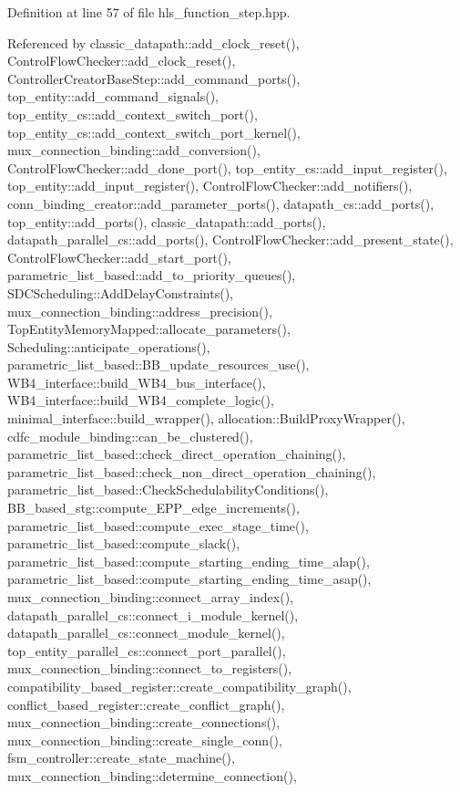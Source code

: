 Definition at line 57 of file hls\+\_\+function\+\_\+step.\+hpp.



Referenced by classic\+\_\+datapath\+::add\+\_\+clock\+\_\+reset(), Control\+Flow\+Checker\+::add\+\_\+clock\+\_\+reset(), Controller\+Creator\+Base\+Step\+::add\+\_\+command\+\_\+ports(), top\+\_\+entity\+::add\+\_\+command\+\_\+signals(), top\+\_\+entity\+\_\+cs\+::add\+\_\+context\+\_\+switch\+\_\+port(), top\+\_\+entity\+\_\+cs\+::add\+\_\+context\+\_\+switch\+\_\+port\+\_\+kernel(), mux\+\_\+connection\+\_\+binding\+::add\+\_\+conversion(), Control\+Flow\+Checker\+::add\+\_\+done\+\_\+port(), top\+\_\+entity\+\_\+cs\+::add\+\_\+input\+\_\+register(), top\+\_\+entity\+::add\+\_\+input\+\_\+register(), Control\+Flow\+Checker\+::add\+\_\+notifiers(), conn\+\_\+binding\+\_\+creator\+::add\+\_\+parameter\+\_\+ports(), datapath\+\_\+cs\+::add\+\_\+ports(), top\+\_\+entity\+::add\+\_\+ports(), classic\+\_\+datapath\+::add\+\_\+ports(), datapath\+\_\+parallel\+\_\+cs\+::add\+\_\+ports(), Control\+Flow\+Checker\+::add\+\_\+present\+\_\+state(), Control\+Flow\+Checker\+::add\+\_\+start\+\_\+port(), parametric\+\_\+list\+\_\+based\+::add\+\_\+to\+\_\+priority\+\_\+queues(), S\+D\+C\+Scheduling\+::\+Add\+Delay\+Constraints(), mux\+\_\+connection\+\_\+binding\+::address\+\_\+precision(), Top\+Entity\+Memory\+Mapped\+::allocate\+\_\+parameters(), Scheduling\+::anticipate\+\_\+operations(), parametric\+\_\+list\+\_\+based\+::\+B\+B\+\_\+update\+\_\+resources\+\_\+use(), W\+B4\+\_\+interface\+::build\+\_\+\+W\+B4\+\_\+bus\+\_\+interface(), W\+B4\+\_\+interface\+::build\+\_\+\+W\+B4\+\_\+complete\+\_\+logic(), minimal\+\_\+interface\+::build\+\_\+wrapper(), allocation\+::\+Build\+Proxy\+Wrapper(), cdfc\+\_\+module\+\_\+binding\+::can\+\_\+be\+\_\+clustered(), parametric\+\_\+list\+\_\+based\+::check\+\_\+direct\+\_\+operation\+\_\+chaining(), parametric\+\_\+list\+\_\+based\+::check\+\_\+non\+\_\+direct\+\_\+operation\+\_\+chaining(), parametric\+\_\+list\+\_\+based\+::\+Check\+Schedulability\+Conditions(), B\+B\+\_\+based\+\_\+stg\+::compute\+\_\+\+E\+P\+P\+\_\+edge\+\_\+increments(), parametric\+\_\+list\+\_\+based\+::compute\+\_\+exec\+\_\+stage\+\_\+time(), parametric\+\_\+list\+\_\+based\+::compute\+\_\+slack(), parametric\+\_\+list\+\_\+based\+::compute\+\_\+starting\+\_\+ending\+\_\+time\+\_\+alap(), parametric\+\_\+list\+\_\+based\+::compute\+\_\+starting\+\_\+ending\+\_\+time\+\_\+asap(), mux\+\_\+connection\+\_\+binding\+::connect\+\_\+array\+\_\+index(), datapath\+\_\+parallel\+\_\+cs\+::connect\+\_\+i\+\_\+module\+\_\+kernel(), datapath\+\_\+parallel\+\_\+cs\+::connect\+\_\+module\+\_\+kernel(), top\+\_\+entity\+\_\+parallel\+\_\+cs\+::connect\+\_\+port\+\_\+parallel(), mux\+\_\+connection\+\_\+binding\+::connect\+\_\+to\+\_\+registers(), compatibility\+\_\+based\+\_\+register\+::create\+\_\+compatibility\+\_\+graph(), conflict\+\_\+based\+\_\+register\+::create\+\_\+conflict\+\_\+graph(), mux\+\_\+connection\+\_\+binding\+::create\+\_\+connections(), mux\+\_\+connection\+\_\+binding\+::create\+\_\+single\+\_\+conn(), fsm\+\_\+controller\+::create\+\_\+state\+\_\+machine(), mux\+\_\+connection\+\_\+binding\+::determine\+\_\+connection(), 